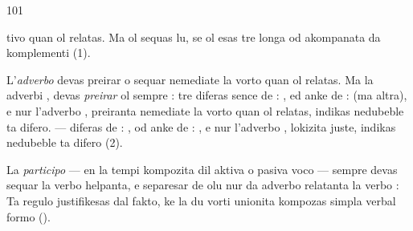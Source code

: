 \begin{VUpage}[105]{101}

\VUcontinue
tivo quan ol relatas. Ma ol sequas lu, se ol esas tre longa\nl
od akompanata da komplementi (1).

L'\textit{adverbo} devas preirar o sequar nemediate la vorto quan\nl
ol relatas. Ma la adverbi ,  devas \textit{preirar} ol sempre :\nl
{} tre diferas sence de : \nl
{}, ed anke de :  (ma altra),\nl
e nur l'adverbo , preiranta nemediate la vorto quan ol\nl
relatas, indikas nedubeble ta difero. --- \cc
{} diferas de : , od\nl
anke de : , e nur l'adverbo\nl
{}, lokizita juste, indikas nedubeble ta difero (2).

La \textit{participo} --- en la tempi kompozita dil aktiva o pasiva\nl
voco --- sempre devas sequar la verbo helpanta, e separesar de\nl
olu nur da adverbo relatanta la verbo : \nl
{} Ta regulo justifikesas dal\nl
fakto, ke la du vorti unionita kompozas simpla verbal formo\nl
().


\end{VUpage}
